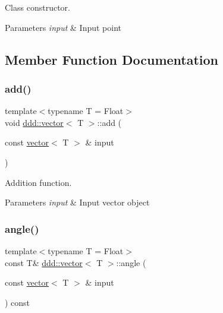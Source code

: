 Class constructor. 


\begin{DoxyParams}{Parameters}
{\em input} & Input point \\
\hline
\end{DoxyParams}


\subsection{Member Function Documentation}
\mbox{\label{classddd_1_1vector_a97eca6a6625002022ab2442b5cbd0462}} 
\subsubsection{\texorpdfstring{add()}{add()}}
{\footnotesize\ttfamily template$<$typename T = Float$>$ \\
void \hyperlink{classddd_1_1vector}{ddd\+::vector}$<$ T $>$\+::add (\begin{DoxyParamCaption}\item[{const \hyperlink{classddd_1_1vector}{vector}$<$ T $>$ \&}]{input }\end{DoxyParamCaption})\hspace{0.3cm}{\ttfamily [inline]}}



Addition function. 


\begin{DoxyParams}{Parameters}
{\em input} & Input vector object \\
\hline
\end{DoxyParams}
\mbox{\label{classddd_1_1vector_ad1a37ce1d1c20c227257fd1fd223c3cf}} 
\subsubsection{\texorpdfstring{angle()}{angle()}\hspace{0.1cm}{\footnotesize\ttfamily [1/4]}}
{\footnotesize\ttfamily template$<$typename T = Float$>$ \\
const T\& \hyperlink{classddd_1_1vector}{ddd\+::vector}$<$ T $>$\+::angle (\begin{DoxyParamCaption}\item[{const \hyperlink{classddd_1_1vector}{vector}$<$ T $>$ \&}]{input }\end{DoxyParamCaption}) const\hspace{0.3cm}{\ttfamily [inline]}}



